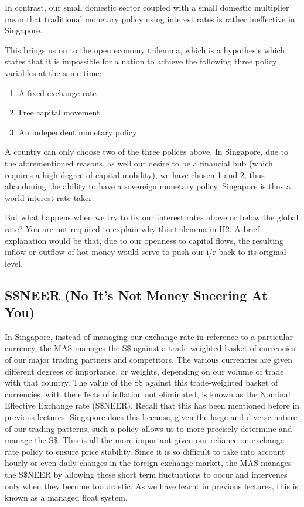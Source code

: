 \documentclass[DIV=calc,11pt,parskip,numbers=noenddot]{scrartcl} %
\begin{document}
In contrast, our small domestic sector coupled with a small domestic multiplier mean that traditional monetary policy using interest rates is rather ineffective in Singapore.

This brings us on to the open economy trilemma, which is a hypothesis which states that it is impossible for a nation to achieve the following three policy variables at the same time:
\begin{enumerate}
\item A fixed exchange rate
\item Free capital movement
\item An independent monetary policy
\end{enumerate}
A country can only choose two of the three polices above. In Singapore, due to the aforementioned reasons, as well our desire to be a financial hub (which requires a high degree of capital mobility), we have chosen 1 and 2, thus abandoning the ability to have a sovereign monetary policy. Singapore is thus a world interest rate taker.

But what happens when we try to fix our interest rates above or below the global rate?  You are not required to explain why this trilemma in H2. A brief explanation would be that, due to our openness to capital flows, the resulting inflow or outflow of hot money would serve to push our i/r back to its original level.
\subsection{S\$NEER (No It's Not Money Sneering At You)}
In Singapore, instead of managing our exchange rate in reference to a particular currency, the MAS manages the S\$ against a trade-weighted basket of currencies of our major trading partners and competitors. The various currencies are given different degrees of importance, or weights, depending on our volume of trade with that country.
The value of the S\$ against this trade-weighted basket of currencies, with the effects of inflation not eliminated, is known as the Nominal Effective Exchange rate (S\$NEER). Recall that this has been mentioned before in previous lectures. Singapore does this because, given the large and diverse nature of our trading patterns, such a policy allows us to more precisely determine and manage the S\$. This is all the more important given our reliance on exchange rate policy to ensure price stability.
Since it is so difficult to take into account hourly or even daily changes in the foreign exchange market, the MAS manages the S\$NEER by allowing these short term fluctuations to occur and intervenes only when they become too drastic. As we have learnt in previous lectures, this is known as a managed float system.  
\end{document}
